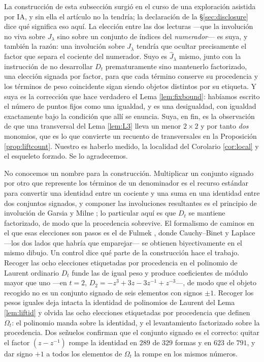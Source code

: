 \documentclass[11pt,reqno]{amsart}
\theoremstyle{plain}
\theoremstyle{definition}
\begin{document}
La construcción de esta subsección surgió en el curso de una exploración asistida por IA, y sin
ella el artículo no la tendría; la declaración de la \S\ref{sec:disclosure} dice qué significa eso
aquí. La
elección entre las dos lecturas ---que la involución no viva sobre $J_\lambda$ sino sobre un conjunto
de índices del \emph{numerador}--- es suya, y también la razón: una involución sobre $J_\lambda$
tendría que ocultar precisamente el factor que separa el cociente del numerador. Suyo es
$\widehat J_\lambda$ mismo, junto con la instrucción de no desarrollar $D_t$ prematuramente sino
mantenerlo factorizado, una elección signada por factor, para que cada término conserve su
procedencia y los términos de peso coincidente sigan siendo objetos distintos por su etiqueta. Y suya es la corrección que hace verdadero el Lema
\ref{lem:fixbound}: habíamos escrito el número de puntos fijos como una igualdad, y es una
desigualdad, con igualdad exactamente bajo la condición que allí se enuncia. Suya, en fin, es la
observación de que una transversal del Lema \ref{lem:L3} lleva un menor $2\times2$ y por tanto
\emph{dos} monomios, que es lo que convierte un recuento de transversales en la Proposición
\ref{prop:liftcount}. Nuestro es haberlo medido, la localidad del Corolario \ref{cor:local} y el
esqueleto forzado. Se lo agradecemos.

No conocemos un nombre para la construcción. Multiplicar un conjunto signado por otro que represente
los términos de un denominador es el recurso estándar para convertir una identidad entre un cociente
y una suma en una identidad entre dos conjuntos signados, y componer las involuciones resultantes es
el principio de involución de Garsia y Milne \cite{GM81}; lo particular aquí es que $D_t$ se mantiene
factorizado, de modo que la procedencia sobrevive. El formalismo de caminos en el que esas elecciones
son pasos es el de Fulmek \cite{Fulmek}, donde Cauchy--Binet y Laplace ---los dos lados que habría
que emparejar--- se obtienen biyectivamente en el mismo dibujo. Un control dice qué parte de la
construcción hace el trabajo. Recoger las ocho elecciones etiquetadas por procedencia en el polinomio
de Laurent ordinario $D_t$ funde las de igual peso y produce coeficientes de módulo mayor que uno
---en $t=2$, $D_2=-z^3+3z-3z^{-1}+z^{-3}$---, de modo que el objeto recogido no es un conjunto
signado de seis elementos con signos $\pm1$. Recoger los pesos iguales deja intacta la identidad de
polinomios de Laurent del Lema \ref{lem:liftid} y olvida las ocho elecciones etiquetadas por
procedencia que definen $\Omega_t$: el polinomio manda sobre la identidad, y el levantamiento
factorizado sobre la procedencia. Dos
señuelos confirman que el conjunto signado es el correcto: quitar el factor $(z-z^{-1})$ rompe la
identidad en $289$ de $329$ formas y en $623$ de $791$, y dar signo $+1$ a todos los elementos de
$\Omega_t$ la rompe en los mismos números.
\end{document}
